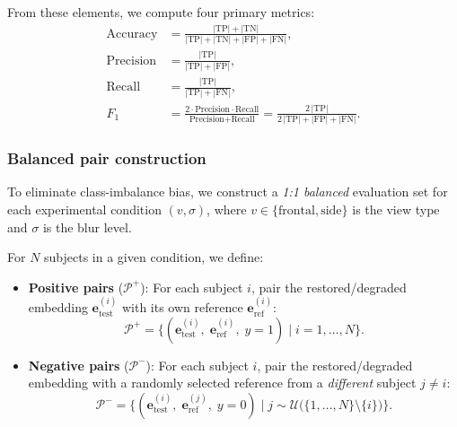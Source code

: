 From these elements, we compute four primary metrics:
\begin{align}
    \text{Accuracy}  &= \frac{|\text{TP}| + |\text{TN}|}{|\text{TP}| + |\text{TN}| + |\text{FP}| + |\text{FN}|}, \label{eq:acc} \\[4pt]
    \text{Precision} &= \frac{|\text{TP}|}{|\text{TP}| + |\text{FP}|}, \label{eq:prec} \\[4pt]
    \text{Recall}    &= \frac{|\text{TP}|}{|\text{TP}| + |\text{FN}|}, \label{eq:rec} \\[4pt]
    F_1              &= \frac{2 \cdot \text{Precision} \cdot \text{Recall}}
                           {\text{Precision} + \text{Recall}}
                      = \frac{2\,|\text{TP}|}
                             {2\,|\text{TP}| + |\text{FP}| + |\text{FN}|}. \label{eq:f1}
\end{align}

\subsubsection{Balanced pair construction}
\label{subsubsec:pairs}

To eliminate class-imbalance bias, we construct a \emph{1:1 balanced}
evaluation set for each experimental condition $(v, \sigma)$, where
$v \in \{\text{frontal}, \text{side}\}$ is the view type and $\sigma$
is the blur level.

For $N$ subjects in a given condition, we define:
\begin{itemize}
    \item \textbf{Positive pairs} ($\mathcal{P}^{+}$): For each subject $i$,
          pair the restored/degraded embedding $\mathbf{e}_{\text{test}}^{(i)}$
          with its own reference $\mathbf{e}_{\text{ref}}^{(i)}$:
    \begin{equation}
        \mathcal{P}^{+} = \bigl\{
            (\mathbf{e}_{\text{test}}^{(i)},\;
             \mathbf{e}_{\text{ref}}^{(i)},\;
             y{=}1)
            \;\big|\; i = 1, \dots, N
        \bigr\}.
        \label{eq:pos_pairs}
    \end{equation}

    \item \textbf{Negative pairs} ($\mathcal{P}^{-}$): For each subject $i$,
          pair the restored/degraded embedding with a randomly selected
          reference from a \emph{different} subject $j \neq i$:
    \begin{equation}
        \mathcal{P}^{-} = \bigl\{
            (\mathbf{e}_{\text{test}}^{(i)},\;
             \mathbf{e}_{\text{ref}}^{(j)},\;
             y{=}0)
            \;\big|\; j \sim \mathcal{U}\bigl(\{1,\dots,N\} \setminus \{i\}\bigr)
        \bigr\}.
        \label{eq:neg_pairs}
    \end{equation}
\end{itemize}

